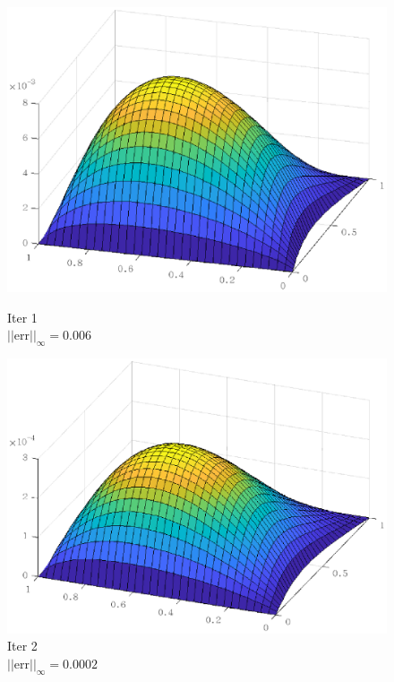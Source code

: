 \documentclass[lang=cn,10pt]{elegantbook}
\begin{document}
\begin{figure}[H]
  \centering
  \begin{minipage}[t]{0.22\linewidth}
      \centering
      \includegraphics[width=0.9\linewidth]{figure/3-5-1.eps}
      \caption*{\small Iter 1 \\ $||\text{err}||_\infty=0.006$}
  \end{minipage}
  \hspace{1em}
  \begin{minipage}[t]{0.22\linewidth}
    \centering
    \includegraphics[width=0.9\linewidth]{figure/3-5-2.eps}
    \caption*{\small Iter 2 \\ $||\text{err}||_\infty=0.0002$}
  \end{minipage}
  \hspace{1em}
  \begin{minipage}[t]{0.22\linewidth}
    \centering

\end{minipage}
\end{figure}
\end{document}
